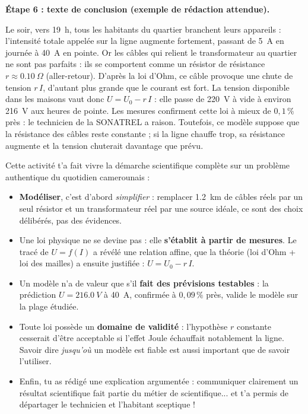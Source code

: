 \documentclass[11pt]{article}
\newcommand{\cle}[1]{{\popxbold\color{popdark}#1}}
\newcounter{popsec}
\newcounter{popsub}
\newcommand{\courssub}[1]{%
  \stepcounter{popsub}%
  \par\vspace{9pt}\noindent{\popxbold\fontsize{11.5}{13}\selectfont\color{popink}{\color{poporange}\thepopsec.\thepopsub}\hspace{6pt}#1}\par\nopagebreak\vspace{4pt}
}
\begin{document}
\begin{exoresolu}
\textbf{Étape 6 : texte de conclusion (exemple de rédaction attendue).}

\og Le soir, vers 19~h, tous les habitants du quartier branchent leurs appareils : l'intensité totale appelée sur la ligne augmente fortement, passant de \SI{5}{A} en journée à \SI{40}{A} en pointe. Or les câbles qui relient le transformateur au quartier ne sont pas parfaits : ils se comportent comme un résistor de résistance $r \approx \SI{0,10}{\Omega}$ (aller-retour). D'après la loi d'Ohm, ce câble provoque une chute de tension $r\,I$, d'autant plus grande que le courant est fort. La tension disponible dans les maisons vaut donc $U = U_0 - r\,I$ : elle passe de \SI{220}{V} à vide à environ \SI{216}{V} aux heures de pointe. Les mesures confirment cette loi à mieux de $0,1\,\%$ près : le technicien de la SONATREL a raison. Toutefois, ce modèle suppose que la résistance des câbles reste constante ; si la ligne chauffe trop, sa résistance augmente et la tension chuterait davantage que prévu. \fg
\end{exoresolu}

\courssub{Bilan de l'activité}

Cette activité t'a fait vivre la \cle{démarche scientifique complète} sur un problème authentique du quotidien camerounais :

\begin{itemize}
\item \textbf{Modéliser}, c'est d'abord \emph{simplifier} : remplacer \SI{1,2}{km} de câbles réels par un seul résistor et un transformateur réel par une source idéale, ce sont des choix délibérés, pas des évidences.
\item Une loi physique ne se devine pas : elle \textbf{s'établit à partir de mesures}. Le tracé de $U = f(I)$ a révélé une relation affine, que la théorie (loi d'Ohm + loi des mailles) a ensuite justifiée : $U = U_0 - r\,I$.
\item Un modèle n'a de valeur que s'il \textbf{fait des prévisions testables} : la prédiction $U = \SI{216,0}{V}$ à \SI{40}{A}, confirmée à $0,09\,\%$ près, valide le modèle sur la plage étudiée.
\item Toute loi possède un \textbf{domaine de validité} : l'hypothèse \og $r$ constante \fg{} cesserait d'être acceptable si l'effet Joule échauffait notablement la ligne. Savoir dire \emph{jusqu'où} un modèle est fiable est aussi important que de savoir l'utiliser.
\item Enfin, tu as rédigé une explication argumentée : communiquer clairement un résultat scientifique fait partie du métier de scientifique... et t'a permis de départager le technicien et l'habitant sceptique !
\end{itemize}
\end{document}
